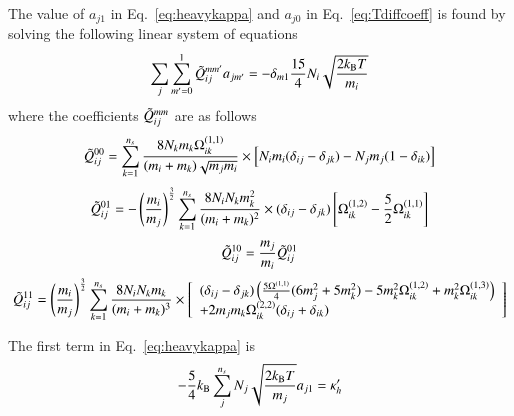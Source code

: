 \documentclass{warpdoc}
\begin{document}
The value of $a_{j1}$ in Eq.\ \ref{eq:heavykappa} and $a_{j0}$ in Eq.\ \ref{eq:Tdiffcoeff} is found by solving the following linear system of equations
\begin{equation}\label{eq:linearsystem1}
  \sum_j \sum_{m'=0}^{1} \Tilde{Q}_{ij}^{m m'} a_{j m'}=-\delta_{m1}\frac{15}{4}N_i\sqrt{\frac{2 k_{\rm B} T}{m_i}}
\end{equation}
where the coefficients $\Tilde{Q}_{ij}^{mm}$ are as follows
\begin{equation}\label{eq:Q00}
  \Tilde{Q}_{ij}^{00}=\sum_{k=1}^{n_s} \frac{8 N_k m_k \Omega_{ik}^{(1,1)}}{(m_i+m_k)\sqrt{m_j m_i}}\times \left[ N_i m_i (\delta_{ij}-\delta_{jk})-N_j m_j (1-\delta_{ik}) \right]
\end{equation}
\begin{equation}
  \Tilde{Q}_{ij}^{01}=-\left( \frac{m_i}{m_j}\right)^{\frac{3}{2}} \sum_{k=1}^{n_s} \frac{8 N_i N_k m_k^2}{(m_i+m_k)^2}\times(\delta_{ij}-\delta_{jk})\left[\Omega_{ik}^{(1,2)}-\frac{5}{2}\Omega_{ik}^{(1,1)} \right]
\end{equation}
\begin{equation}
  \Tilde{Q}_{ij}^{10}=\frac{m_j}{m_i}\Tilde{Q}_{ij}^{01}
\end{equation}
\begin{equation}\label{eq:Q11}
    \Tilde{Q}_{ij}^{11}=\left(\frac{m_i}{m_j}\right)^{\frac{3}{2}} \sum_{k=1}^{n_s}\frac{8 N_i N_k m_k}{(m_i+m_k)^3}\times\left[\begin{array}{l} (\delta_{ij}-\delta_{jk}) \left( \frac{5 \Omega^{(1,1)}}{4} (6 m_j^2+5m_k^2)-5m_k^2\Omega_{ik}^{(1,2)}+m_k^2\Omega_{ik}^{(1,3)}\right) \\ +2m_j m_k \Omega_{ik}^{(2,2)}(\delta_{ij}+\delta_{ik})\end{array}\right]
\end{equation}

The first term in Eq.\ \ref{eq:heavykappa} is
\begin{equation} \label{eq:lambdaprime}
  -\frac{5}{4}k_{\rm B}\sum_{j}^{n_s} N_{j}\sqrt{\frac{2k_{\rm B}T}{m_j}}a_{j1}=\kappa_h'
\end{equation}
\end{document}
